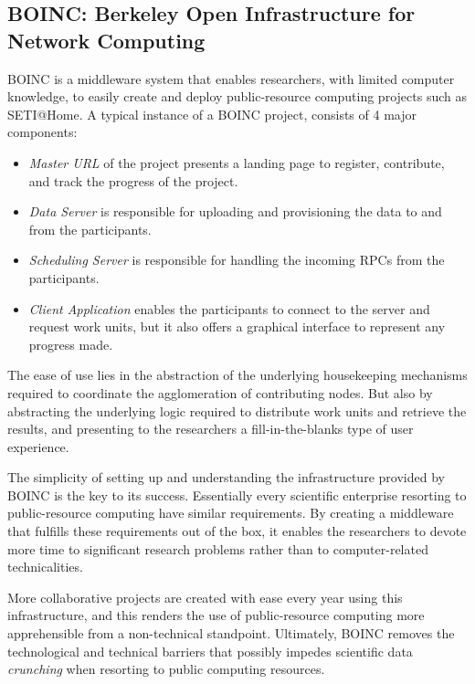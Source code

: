 \documentclass[12pt, titlepage]{uo_temp}
\begin{document}
     \subsection{BOINC: Berkeley Open Infrastructure for Network Computing}
     BOINC \cite{anderson2004boinc} is a middleware system that enables researchers, with limited
     computer knowledge, to easily create and deploy public-resource computing projects such as
     SETI@Home.
     A typical instance of a BOINC project, consists of 4 major components:
     \begin{itemize}
       \item \emph{Master URL} of the project presents a landing page to register,
         contribute, and track the progress of the project.
       \item \emph{Data Server} is responsible for uploading and provisioning the data to
         and from the participants.
       \item \emph{Scheduling Server} is responsible for handling the incoming RPCs from the
         participants.
       \item \emph{Client Application} enables the participants to connect to the server
         and request work units, but it also offers a graphical interface to represent any
         progress made.
     \end{itemize}
     The ease of use lies in the abstraction of the underlying housekeeping mechanisms required to
     coordinate the agglomeration of contributing nodes. But also by abstracting the underlying
     logic required to distribute work units and retrieve the results, and presenting to
     the researchers a fill-in-the-blanks type of user experience.

     The simplicity of setting up and understanding the infrastructure provided by BOINC
     is the key to its success. Essentially every scientific enterprise resorting to
     public-resource computing have similar requirements. By creating a middleware that
     fulfills these requirements out of the box, it enables the researchers to devote more
     time to significant research problems rather than to computer-related technicalities.

     More collaborative projects are created with ease every year using this
     infrastructure, and this renders the use of public-resource computing more
     apprehensible from a non-technical standpoint. Ultimately, BOINC removes the
     technological and technical barriers that possibly impedes scientific data
     \emph{crunching} when resorting to public computing resources.
\end{document}
